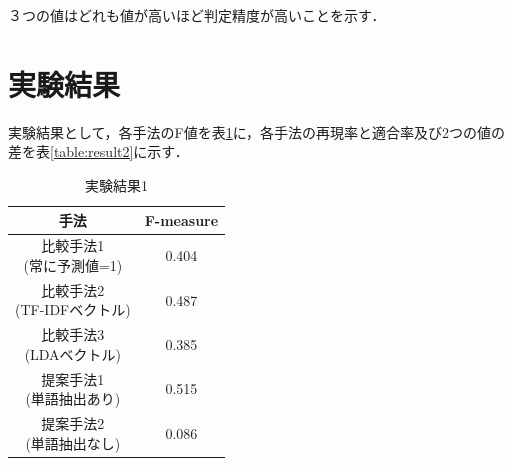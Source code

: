 ３つの値はどれも値が高いほど判定精度が高いことを示す．

\section{実験結果}
\label{exp:result}
実験結果として，各手法のF値を表\ref{table:result1}に，各手法の再現率と適合率及び2つの値の差を表\ref{table:result2}に示す．
\begin{table}[htbp]
\begin{center}
  \begin{tabular}{| c | c |} \hline
    手法 & F-measure\\ \hline \hline
   \shortstack{比較手法1\\(常に予測値=1)} &0.404 \\ \hline
   \shortstack{比較手法2\\(TF-IDFベクトル)} &0.487\\ \hline
   \shortstack{比較手法3\\(LDAベクトル)} &0.385\\ \hline
   \shortstack{提案手法1\\(単語抽出あり)} &0.515\\ \hline%
   \shortstack{提案手法2\\(単語抽出なし)} &0.086\\ \hline
    \end{tabular}
    \caption{実験結果1}
    \label{table:result1}
\end{center}
\end{table}

